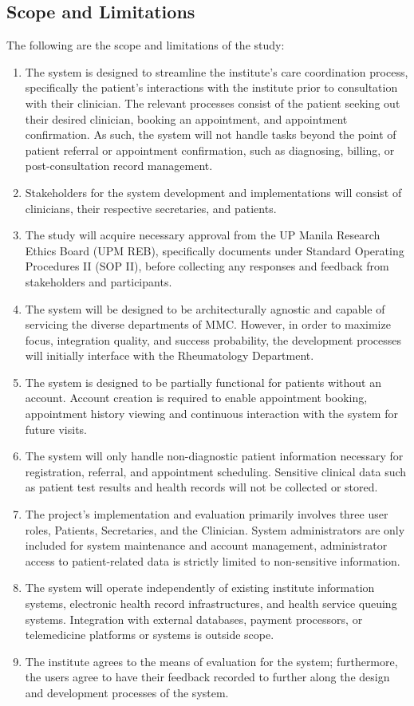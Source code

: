 \documentclass[11pt,a4paper,titlepage]{article}
\begin{document}
	\subsection{Scope and Limitations}
	The following are the scope and limitations of the study: 
	\begin{enumerate}
		\item The system is designed to streamline the institute's care coordination process, specifically the patient's interactions with the institute prior to consultation with their clinician. The relevant processes consist of the patient seeking out their desired clinician, booking an appointment, and appointment confirmation. As such, the system will not handle tasks beyond the point of patient referral or appointment confirmation, such as diagnosing, billing, or post-consultation record management.
		\item Stakeholders for the system development and implementations will consist of clinicians, their respective secretaries, and patients. 
		\item The study will acquire necessary approval from the UP Manila Research Ethics Board (UPM REB), specifically documents under Standard Operating Procedures II  (SOP II), before collecting any responses and feedback from stakeholders and participants.
		\item The system will be designed to be architecturally agnostic and capable of servicing the diverse departments of MMC. However, in order to maximize focus, integration quality, and success probability, the development processes will initially interface with the Rheumatology Department.  
		\item The system is designed to be partially functional for patients without an account. Account creation is required to enable appointment booking, appointment history viewing and continuous interaction with the system for future visits. 
		\item The system will only handle non-diagnostic patient information necessary for registration, referral, and appointment scheduling. Sensitive clinical data such as patient test results and health records will not be collected or stored. 
		\item The project's implementation and evaluation primarily involves three user roles, Patients, Secretaries, and the Clinician. System administrators are only included for system maintenance and account management, administrator access to patient-related data is strictly limited to non-sensitive information. 
		\item The system will operate independently of existing institute information systems, electronic health record infrastructures, and health service queuing systems. Integration with external databases, payment processors, or telemedicine platforms or systems is outside scope.
		\item  The institute agrees to the means of evaluation for the system; furthermore, the users agree to have their feedback recorded to further along the design and development processes of the system. 
	\end{enumerate}
	
\end{document}
